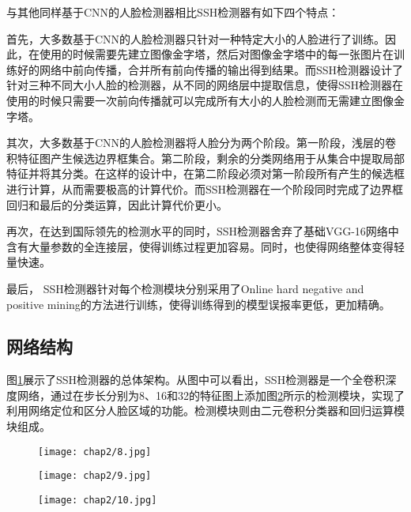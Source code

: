 与其他同样基于CNN的人脸检测器相比SSH检测器有如下四个特点：

首先，大多数基于CNN的人脸检测器只针对一种特定大小的人脸进行了训练。因此，在使用的时候需要先建立图像金字塔，然后对图像金字塔中的每一张图片在训练好的网络中前向传播，合并所有前向传播的输出得到结果。而SSH检测器设计了针对三种不同大小人脸的检测器，从不同的网络层中提取信息，使得SSH检测器在使用的时候只需要一次前向传播就可以完成所有大小的人脸检测而无需建立图像金字塔。

其次，大多数基于CNN的人脸检测器将人脸分为两个阶段。第一阶段，浅层的卷积特征图产生候选边界框集合。第二阶段，剩余的分类网络用于从集合中提取局部特征并将其分类。在这样的设计中，在第二阶段必须对第一阶段所有产生的候选框进行计算，从而需要极高的计算代价。而SSH检测器在一个阶段同时完成了边界框回归和最后的分类运算，因此计算代价更小。

再次，在达到国际领先的检测水平的同时，SSH检测器舍弃了基础VGG-16网络\cite{simonyan2014very}中含有大量参数的全连接层，使得训练过程更加容易。同时，也使得网络整体变得轻量快速。

最后， SSH检测器针对每个检测模块分别采用了Online hard negative and positive mining\cite{shrivastava2016training}的方法进行训练，使得训练得到的模型误报率更低，更加精确。

\subsection{网络结构}

图\ref{fig:ssh:arc}展示了SSH检测器的总体架构。从图中可以看出，SSH检测器是一个全卷积深度网络，通过在步长分别为8、16和32的特征图上添加图\ref{fig:ssh:det}所示的检测模块，实现了利用网络定位和区分人脸区域的功能。检测模块则由二元卷积分类器和回归运算模块组成。

\begin{figure}[!htp]
	\centering
	\texttt{[image: chap2/8.jpg]}
	\label{fig:ssh:arc}
\end{figure}

\begin{figure}[!htp]
	\centering
	\texttt{[image: chap2/9.jpg]}
	\label{fig:ssh:det}
\end{figure}

\begin{figure}[!htp]
	\centering
	\texttt{[image: chap2/10.jpg]}
	\label{fig:ssh:context}
\end{figure}

